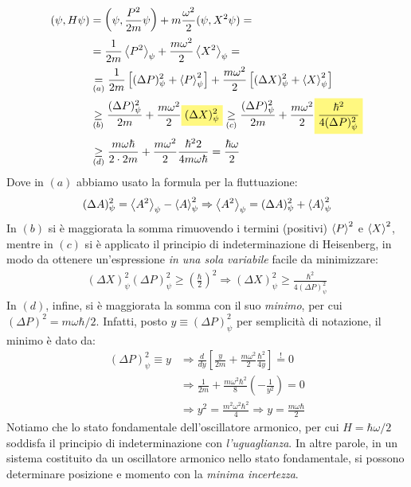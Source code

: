 \documentclass[../../FisicaTeorica.tex]{subfiles}
\begin{document}
\begin{enumerate}
\begin{align*}
(\psi, H\psi)&=\left(\psi, \frac{P^2}{2m}\psi\right) + m\frac{\omega^2}{2}(\psi, X^2\psi) =\\
&=\frac{1}{2m}\avg{P^2}_\psi + \frac{m\omega^2}{2}\avg{X^2}_\psi =\\
&\underset{(a)}{=}
\frac{1}{2m}\left[
(\Delta P)^2_\psi + \avg{P}_\psi^2
\right ] +\frac{m\omega^2}{2}\left[
(\Delta X)^2_\psi + \avg{X}^2_\psi
\right]\\
&\underset{(b)}{\geq} \frac{(\Delta P)^2_\psi}{2m} + \frac{m\omega^2}{2}\hlc{Yellow}{(\Delta X)^2_\psi} \underset{(c)}{\geq} \frac{(\Delta P)^2_\psi}{2m} + \frac{m\omega^2}{2}\hlc{Yellow}{\frac{\hbar^2}{4(\Delta P)^2_\psi}} \\
&\underset{(d)}{\geq} \frac{m\omega \hbar }{2 \cdot 2m} + \frac{m\omega^2}{2} \frac{\hbar^2 2}{4m\omega \hbar} = \frac{\hbar\omega}{2}
\end{align*}
Dove in $(a)$ abbiamo usato la formula per la fluttuazione:
\begin{align*}
(\Delta A)^2_\psi = \left\langle{A^2}\right\rangle_\psi - \left\langle{A}\right\rangle^2_\psi \Rightarrow \left\langle{A^2}\right\rangle_\psi = (\Delta A)^2_\psi + \left\langle{A}\right\rangle^2_\psi
\end{align*}
In $(b)$ si è maggiorata la somma rimuovendo i termini (positivi) $\left\langle{P}\right\rangle^2$ e $\left\langle{X}\right\rangle^2$, mentre in $(c)$ si è applicato il principio di indeterminazione di Heisenberg, in modo da ottenere un'espressione \textit{in una sola variabile} facile da minimizzare:
\begin{align*}
(\Delta X)^2_\psi (\Delta P)^2_\psi \geq \left(\frac{\hbar}{2}\right)^2 \Rightarrow  (\Delta X)^2_\psi \geq \frac{\hbar^2}{4(\Delta P)^2_\psi}
\end{align*}
In $(d)$, infine, si è maggiorata la somma con il suo \textit{minimo}, per cui $(\Delta P)^2 = m\omega \hbar/2$. Infatti, posto $y\equiv(\Delta P)^2_\psi$ per semplicità di notazione, il minimo è dato da:
\begin{align*}
(\Delta P)^2_\psi \equiv y &\Rightarrow \frac{d}{dy}\left[
\frac{y}{2m}+\frac{m\omega^2}{2}\frac{\hbar^2}{4y}
\right] \overset{!}{=} 0\\
&\Rightarrow \frac{1}{2m} + \frac{m\omega^2 \hbar^2}{8}\left(-\frac{1}{y^2}\right)=0\\
 &\Rightarrow y^2 = \frac{m^2 \omega^2 \hbar^2}{4}\Rightarrow y =\frac{m\omega \hbar}{2}
\end{align*}
Notiamo che lo stato fondamentale dell'oscillatore armonico, per cui $H=\hbar\omega/2$ soddisfa il principio di indeterminazione con \textit{l'uguaglianza}. In altre parole, in un sistema costituito da un oscillatore armonico nello stato fondamentale, si possono determinare posizione e momento con la \textit{minima incertezza}.
\end{enumerate}
\end{document}
